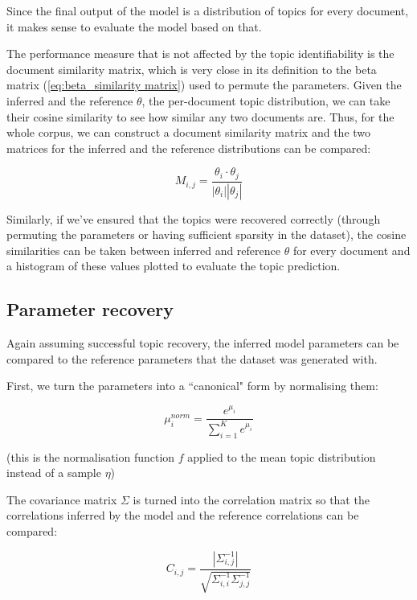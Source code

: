 \documentclass[12pt,a4paper,twoside,openright]{report}
\begin{document}
Since the final output of the model is a distribution of topics for every document, it makes sense to evaluate the model based on that.

The performance measure that is not affected by the topic identifiability is the document similarity matrix, which is very close in its definition to the beta matrix (\ref{eq:beta_similarity matrix}) used to permute the parameters. Given the inferred and the reference $\theta$, the per-document topic distribution, we can take their cosine similarity to see how similar any two documents are. Thus, for the whole corpus, we can construct a document similarity matrix and the two matrices for the inferred and the reference distributions can be compared:

\begin{equation}\label{eq:document_similarity_matrix}
M_{i,j} = \frac{\theta_i \cdot \theta_j}{|\theta_i||\theta_j|}
\end{equation}

Similarly, if we've ensured that the topics were recovered correctly (through permuting the parameters or having sufficient sparsity in the dataset), the cosine similarities can be taken between inferred and reference $\theta$ for every document and a histogram of these values plotted to evaluate the topic prediction.

\subsection{Parameter recovery}

Again assuming successful topic recovery, the inferred model parameters can be compared to the reference parameters that the dataset was generated with.

First, we turn the parameters into a ``canonical" form by normalising them:

\begin{equation}
\mu^{norm}_i = \frac{e^{\mu_i}}{\sum\limits_{i=1}^K{e^{\mu_i}}}
\end{equation}

(this is the normalisation function $f$ applied to the mean topic distribution instead of a sample $\eta$)

The covariance matrix $\Sigma$ is turned into the correlation matrix so that the correlations inferred by the model and the reference correlations can be compared:

\begin{equation}
C_{i, j} = \frac{|\Sigma^{-1}_{i, j}|}{\sqrt{\Sigma^{-1}_{i, i}\Sigma^{-1}_{j, j}}}
\end{equation}
\end{document}
